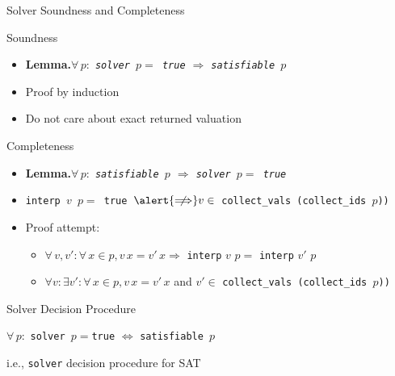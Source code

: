 \documentclass[aspectratio=169,xcolor=dvipsnames]{beamer}
\begin{document}
    \begin{frame}{Solver Soundness and Completeness}
        \begin{block}{Soundness}
            \begin{itemize}
                \item \textbf{Lemma.}\hspace*{8pt}\emph{$\forall\,p :$ \texttt{solver $p =$\,true} $\Longrightarrow$ \texttt{satisfiable $p$}}
                \item Proof by induction
                \item Do \alert{not} care about \alert{exact} returned valuation
            \end{itemize}
        \end{block}

        \pause

        \begin{block}{Completeness}
            \begin{itemize}
                \item \textbf{Lemma.}\hspace*{8pt}\emph{$\forall\,p :$ \texttt{satisfiable $p$} $\Longrightarrow$ \texttt{solver $p =$\,true}}
                \item \texttt{interp $v$ $p =$\,true $\alert{\centernot\Longrightarrow} v \in$ collect\_vals\,(collect\_ids $p$))}
                \pause
                \item Proof attempt:
                \begin{itemize}
                    \item $\forall\,v, v' : \forall\,x \in p, v\,x = v'\,x \Longrightarrow$ \texttt{interp} $v$ $p =$ \texttt{interp} $v'$ $p$
                    \item $\forall v : \exists v' : \forall\,x \in p, v\,x = v'\,x$ and $v' \in$ \texttt{collect\_vals\,(collect\_ids $p$))} 
                \end{itemize}
            \end{itemize}
        \end{block}
    \end{frame}

    \begin{frame}{Solver Decision Procedure}
        \begin{theorem}
            $\forall\,p :$ \texttt{solver $p =$true} $\Longleftrightarrow$ \texttt{satisfiable $p$}
        \end{theorem}

        \pause
        
        \begin{center}
            \Large i.e., \texttt{solver} decision procedure for SAT
        \end{center}
    \end{frame}
\end{document}
